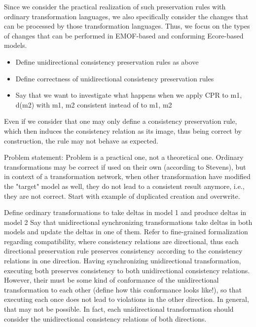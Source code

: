 Since we consider the practical realization of such preservation rules with ordinary transformation languages, we also specifically consider the changes that can be processed by those transformation languages.
Thus, we focus on the types of changes that can be performed in EMOF-based and conforming Ecore-based models.




\begin{itemize}
    \item Define unidirectional consistency preservation rules as above
    \item Define correctness of unidirectional consistency preservation rules
    \item Say that we want to investigate what happens when we apply CPR to m1, d(m2) with m1, m2 consistent instead of to m1, m2
\end{itemize}



Even if we consider that one may only define a consistency preservation rule, which then induces the consistency relation as its image, thus being correct by construction, the rule may not behave as expected.


Problem statement: Problem is a practical one, not a theoretical one.
Ordinary transformations may be correct if used on their own (according to Stevens), but in context of a transformation network, when other transformation have modified the "target" model as well, they do not lead to a consistent result anymore, i.e., they are not correct.
Start with example of duplicated creation and overwrite.

Define ordinary transformations to take deltas in model 1 and produce deltas in model 2
Say that unidirectional synchronizing transformations take deltas in both models and update the deltas in one of them.
Refer to fine-grained formalization regarding compatibility, where consistency relations are directional, thus each directional preservation rule preserves consistency according to the consistency relations in one direction.
Having synchronizing unidirectional transformation, executing both preserves consistency to both unidirectional consistency relations. However, their must be some kind of conformance of the unidirectional transformation to each other (define how this conformance looks like!), so that executing each once does not lead to violations in the other direction. In general, that may not be possible. In fact, each unidirectional transformation should consider the unidirectional consistency relations of both directions.

